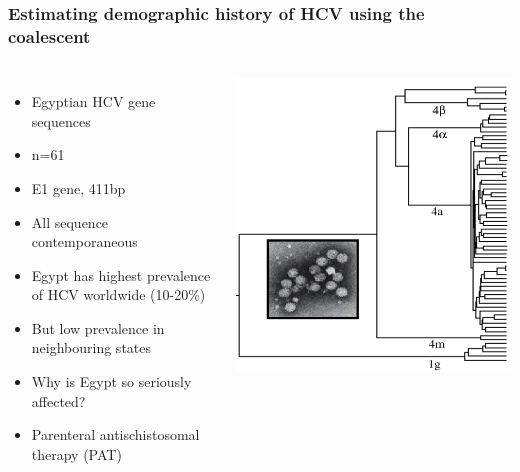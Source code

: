 \begin{frame}
\frametitle{Estimating demographic history of HCV using the coalescent}

\begin{columns}[t]


\scriptsize{
\begin{itemize}
	\item Egyptian HCV gene sequences
	\item n=61
	\item E1 gene, 411bp
	\item All sequence contemporaneous
	\item Egypt has highest prevalence of HCV worldwide (10-20\%)
	\item But low prevalence in neighbouring states
	\item Why is Egypt so seriously affected?
	\item Parenteral antischistosomal therapy (PAT)
\end{itemize}
}


\includegraphics[width=\textwidth]{../../images/HistoryOfHCV}

\end{columns}

\end{frame}

